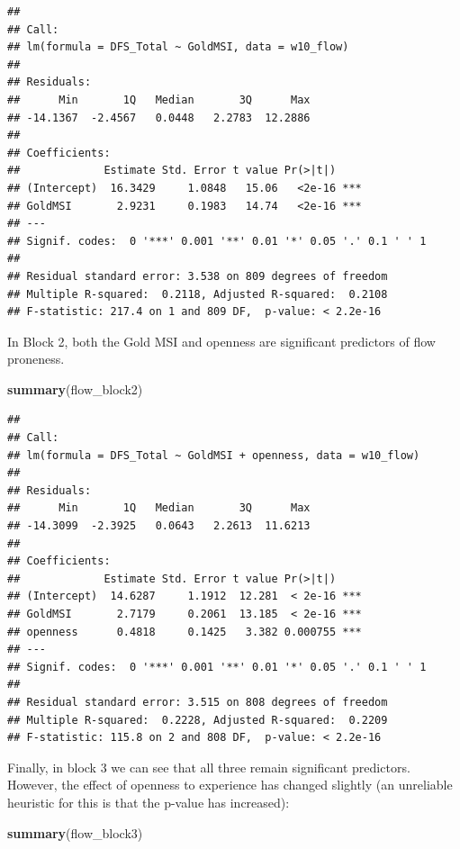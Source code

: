 \documentclass[
]{book}
\newenvironment{Shaded}{\begin{snugshade}}{\end{snugshade}}
\newcommand{\FunctionTok}[1]{\textcolor[rgb]{0.13,0.29,0.53}{\textbf{#1}}}
\newcommand{\NormalTok}[1]{#1}
\begin{document}
\begin{verbatim}
## 
## Call:
## lm(formula = DFS_Total ~ GoldMSI, data = w10_flow)
## 
## Residuals:
##      Min       1Q   Median       3Q      Max 
## -14.1367  -2.4567   0.0448   2.2783  12.2886 
## 
## Coefficients:
##             Estimate Std. Error t value Pr(>|t|)    
## (Intercept)  16.3429     1.0848   15.06   <2e-16 ***
## GoldMSI       2.9231     0.1983   14.74   <2e-16 ***
## ---
## Signif. codes:  0 '***' 0.001 '**' 0.01 '*' 0.05 '.' 0.1 ' ' 1
## 
## Residual standard error: 3.538 on 809 degrees of freedom
## Multiple R-squared:  0.2118, Adjusted R-squared:  0.2108 
## F-statistic: 217.4 on 1 and 809 DF,  p-value: < 2.2e-16
\end{verbatim}

In Block 2, both the Gold MSI and openness are significant predictors of flow proneness.

\begin{Shaded}
\begin{Highlighting}[]
\FunctionTok{summary}\NormalTok{(flow\_block2)}
\end{Highlighting}
\end{Shaded}

\begin{verbatim}
## 
## Call:
## lm(formula = DFS_Total ~ GoldMSI + openness, data = w10_flow)
## 
## Residuals:
##      Min       1Q   Median       3Q      Max 
## -14.3099  -2.3925   0.0643   2.2613  11.6213 
## 
## Coefficients:
##             Estimate Std. Error t value Pr(>|t|)    
## (Intercept)  14.6287     1.1912  12.281  < 2e-16 ***
## GoldMSI       2.7179     0.2061  13.185  < 2e-16 ***
## openness      0.4818     0.1425   3.382 0.000755 ***
## ---
## Signif. codes:  0 '***' 0.001 '**' 0.01 '*' 0.05 '.' 0.1 ' ' 1
## 
## Residual standard error: 3.515 on 808 degrees of freedom
## Multiple R-squared:  0.2228, Adjusted R-squared:  0.2209 
## F-statistic: 115.8 on 2 and 808 DF,  p-value: < 2.2e-16
\end{verbatim}

Finally, in block 3 we can see that all three remain significant predictors. However, the effect of openness to experience has changed slightly (an unreliable heuristic for this is that the p-value has increased):

\begin{Shaded}
\begin{Highlighting}[]
\FunctionTok{summary}\NormalTok{(flow\_block3)}
\end{Highlighting}
\end{Shaded}
\end{document}
